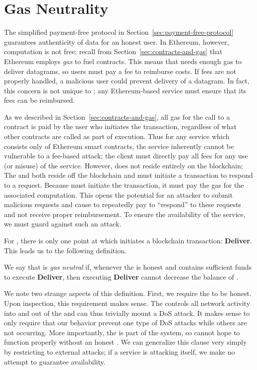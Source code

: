 \section{Gas Neutrality}
\label{sec:gas-neutrality}

The simplified payment-free protocol in Section~\ref{sec:payment-free-protocol} guarantees authenticity of data for an honest user.
In Ethereum, however, computation is not free; recall from Section~\ref{sec:contracts-and-gas} that Ethereum employs \emph{gas} to fuel contracts.
This means that \tc needs enough gas to deliver datagrams, so users must pay a fee to reimburse costs.
If fees are not properly handled, a malicious user could prevent delivery of a datagram.
In fact, this concern is not unique to \tc; any Ethereum-based service must ensure that its fees can be reimbursed.

As we described in Section~\ref{sec:contracts-and-gas}, all gas for the call to a contract is paid by the user who initiates the transaction,
regardless of what other contracts are called as part of execution.
Thus for any service which consists only of Ethereum smart contracts, the service inherently cannot be vulnerable to a fee-based attack;
the client must directly pay all fees for any use (or misuse) of the service.
However, \tc does not reside entirely on the blockchain;
The \medname and \encname both reside off the blockchain and must initiate a transaction to respond to a request.
Because \tc must initiate the transaction, it must pay the gas for the associated computation.
This opens the potential for an attacker to submit malicious requests and cause \tc to repeatedly pay to ``respond'' to these requests and not receive proper reimbursement.
To ensure the availability of the service, we must guard against such an attack.

For \tc, there is only one point at which \tc initiates a blockchain transaction: {\bf Deliver}.
This leads us to the following definition.

\begin{definition}
  \label{def:tc-gas-neutrality}
  We say that \tc is \emph{gas neutral} if, whenever the \medname is honest and \tcadd contains sufficient funds to execute {\bf Deliver},
  then executing {\bf Deliver} cannot decrease the balance of \tcadd.
\end{definition}

We note two strange aspects of this definition.
First, we require the \medname to be honest.
Upon inspection, this requirement makes sense.
The \medname controls all network activity into and out of the \encname and can thus trivially mount a DoS attack.
It makes sense to only require that our behavior prevent one type of DoS attacks while others are not occurring.
More importantly, the \medname is part of the \tc system, so \tc cannot hope to function properly without an honest \medname.
We can generalize this clause very simply by restricting to external attacks;
if a service is attacking itself, we make no attempt to guarantee availability.

